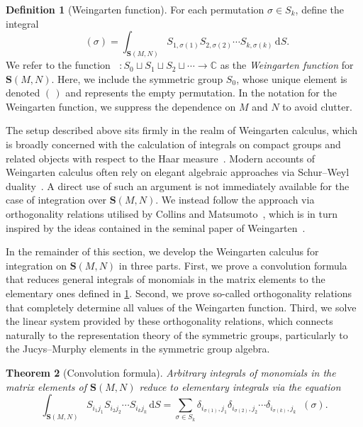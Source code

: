 \documentclass[a4paper]{article}
\theoremstyle{plain}
\newtheorem{theorem}{Theorem}
\numberwithin{theorem}{section}
\theoremstyle{definition}
\newtheorem{definition}[theorem]{Definition}
\theoremstyle{remark}
\newcommand{\dd}{\mathrm{d}}
\newcommand{\SM}{\mathbf{S}}			%
\newcommand{\sm}{S}					%
\DeclareMathOperator{\SW}{Wg^{\SM}}		%
\newcommand{\SG}{S} 					%
\begin{document}
\begin{definition}[Weingarten function] \label{def:weingarten}
For each permutation $\sigma \in S_k$, define the integral
\[
\SW(\sigma) = \int_{\SM(M,N)} \sm_{1,\sigma(1)} \sm_{2,\sigma(2)} \cdots \sm_{k,\sigma(k)} \, \dd \sm.
\]
We refer to the function $\SW: \SG_0 \sqcup \SG_1 \sqcup \SG_2 \sqcup \cdots \to \mathbb{C}$ as the {\em Weingarten function} for $\SM(M,N)$. Here, we include the symmetric group $S_0$, whose unique element is denoted $(\,)$ and represents the empty permutation. In the notation for the Weingarten function, we suppress the dependence on $M$ and $N$ to avoid clutter.
\end{definition}


The setup described above sits firmly in the realm of Weingarten calculus, which is broadly concerned with the calculation of integrals on compact groups and related objects with respect to the Haar measure~\cite{col-mat-nov22}. Modern accounts of Weingarten calculus often rely on elegant algebraic approaches via Schur--Weyl duality~\cite{col03, col-sni06}. A direct use of such an argument is not immediately available for the case of integration over $\SM(M,N)$. We instead follow the approach via orthogonality relations utilised by Collins and Matsumoto~\cite{col-mat17}, which is in turn inspired by the ideas contained in the seminal paper of Weingarten~\cite{wei78}. 


In the remainder of this section, we develop the Weingarten calculus for integration on $\SM(M,N)$ in three parts. First, we prove a convolution formula that reduces general integrals of monomials in the matrix elements to the elementary ones defined in \cref{def:weingarten}. Second, we prove so-called orthogonality relations that completely determine all values of the Weingarten function. Third, we solve the linear system provided by these orthogonality relations, which connects naturally to the representation theory of the symmetric groups, particularly to the Jucys--Murphy elements in the symmetric group algebra.


\begin{theorem}[Convolution formula] \label{thm:convolution}
Arbitrary integrals of monomials in the matrix elements of $\SM(M,N)$ reduce to elementary integrals via the equation
\[
\int_{\SM(M,N)} \sm_{i_1j_1} \sm_{i_2j_2} \cdots \sm_{i_kj_k} \, \dd \sm = \sum_{\sigma \in \SG_k} \delta_{i_{\sigma(1)},j_1} \delta_{i_{\sigma(2)},j_2} \cdots \delta_{i_{\sigma(k)},j_k} \SW(\sigma).
\]
\end{theorem}
\end{document}
